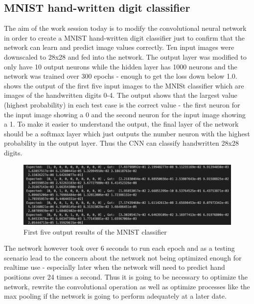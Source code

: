 \subsection{MNIST hand-written digit classifier}

The aim of the work session today is to modify the convolutional neural network in order to create a MNIST hand-written digit classifier just to confirm that the network can learn and predict image values correctly. Ten input images were downscaled to 28x28 and fed into the network. The output layer was modified to only have 10 output neurons while the hidden layer has 1000 neurons and the network was trained over 300 epochs - enough to get the loss down below 1.0.  shows the output of the first five input images to the MNISt classifier which are images of the handwritten digits 0-4. The output shows that the largest value (highest probability) in each test case is the correct value - the first neuron for the input image showing a 0 and the second neuron for the input image showing a 1. To make it easier to understand the output, the final layer of the network should be a softmax layer which just outputs the number neuron with the highest probability in the output layer. Thus the CNN can classify handwritten 28x28 digits.\\

\begin{figure}[h]
    \centering
    \includegraphics[width=0.8\linewidth]{figures/mnist_first_5_results.png}
    \caption{First five output results of the MNIST classifier}
    \label{fig:mnist_first_5_results}
\end{figure}

The network however took over 6 seconds to run each epoch and as a testing scenario lead to the concern about the network not being optimized enough for realtime use - especially later when the network will need to predict hand positions over 24 times a second. Thus it is going to be necessary to optimize the network, rewrite the convolutional operation as well as optimize processes like the max pooling if the network is going to perform adequately at a later date.  \\

